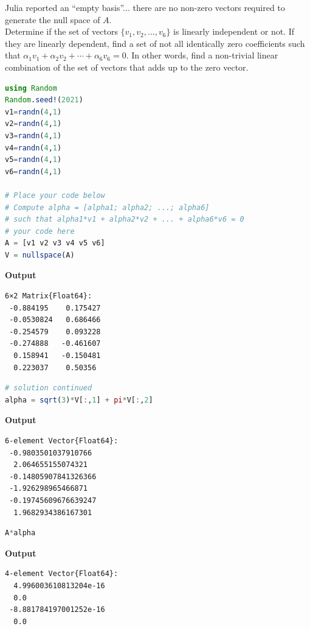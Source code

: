 \vspace*{.2cm}

Julia reported an ``empty basis''... there are no non-zero vectors required to generate the null space of $A$.\\

 Determine if the set of vectors $\{v_1, v_2, ..., v_6\}$ is linearly independent or not. If they are linearly dependent, find a set of not all identically zero coefficients such that $\alpha_1 v_1 + \alpha_2 v_2 + \cdots + \alpha_6 v_6= 0$. In other words, find a non-trivial linear combination of the set of vectors that adds up to the zero vector.\\

\begin{lstlisting}[language=Julia,style=mystyle]
using Random
Random.seed!(2021)
v1=randn(4,1)
v2=randn(4,1)
v3=randn(4,1)
v4=randn(4,1)
v5=randn(4,1)
v6=randn(4,1)

# Place your code below
# Compute alpha = [alpha1; alpha2; ...; alpha6]
# such that alpha1*v1 + alpha2*v2 + ... + alpha6*v6 = 0
# your code here
A = [v1 v2 v3 v4 v5 v6]
V = nullspace(A)
\end{lstlisting}
\textbf{Output} 
\begin{verbatim}
6×2 Matrix{Float64}:
 -0.884195    0.175427
 -0.0530824   0.686466
 -0.254579    0.093228
 -0.274888   -0.461607
  0.158941   -0.150481
  0.223037    0.50356
\end{verbatim}

\vspace*{.2cm}

\begin{lstlisting}[language=Julia,style=mystyle]
# solution continued
alpha = sqrt(3)*V[:,1] + pi*V[:,2]
\end{lstlisting}
\textbf{Output} 
\begin{verbatim}
6-element Vector{Float64}:
 -0.9803501037910766
  2.064655155074321
 -0.14805907841326366
 -1.926298965466871
 -0.19745609676639247
  1.9682934386167301
\end{verbatim}

\vspace*{.2cm}

\begin{lstlisting}[language=Julia,style=mystyle]
A*alpha
\end{lstlisting}
\textbf{Output} 
\begin{verbatim}
4-element Vector{Float64}:
  4.996003610813204e-16
  0.0
 -8.881784197001252e-16
  0.0
\end{verbatim}

